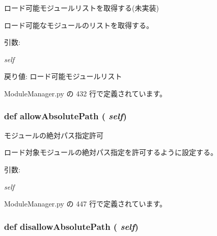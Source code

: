 ロード可能モジュールリストを取得する(未実装) 

ロード可能なモジュールのリストを取得する。

\begin{Desc}
\item[引数:]
\begin{description}
\item[{\em self}]\end{description}
\end{Desc}
\begin{Desc}
\item[戻り値:]ロード可能モジュールリスト \end{Desc}


 ModuleManager.py の 432 行で定義されています。
\subsubsection{\setlength{\rightskip}{0pt plus 5cm}def allowAbsolutePath ( {\em self})}\label{classsource__py_1_1_module_manager_1_1_module_manager_df5007ae76f14eb13e4795dbd46db105}


モジュールの絶対パス指定許可 

ロード対象モジュールの絶対パス指定を許可するように設定する。

\begin{Desc}
\item[引数:]
\begin{description}
\item[{\em self}]\end{description}
\end{Desc}


 ModuleManager.py の 447 行で定義されています。
\subsubsection{\setlength{\rightskip}{0pt plus 5cm}def disallowAbsolutePath ( {\em self})}\label{classsource__py_1_1_module_manager_1_1_module_manager_fb1798da32eb0f0659f29a71ced16c98}


